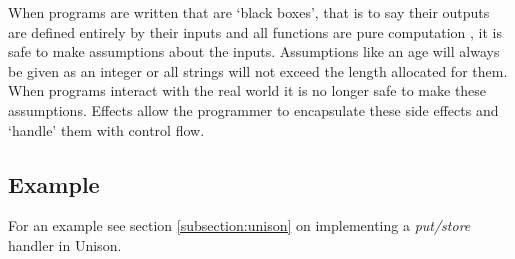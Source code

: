 \documentclass[logo,bsc,singlespacing,parskip]{infthesis}
\begin{document}
When programs are written that are `black boxes', that is to say their outputs
are defined entirely by their inputs and all functions are pure computation
\cite{hughes1989functional}, it is safe to make assumptions about the inputs.
Assumptions like an age will always be given as an integer or all strings will
not exceed the length allocated for them. When programs interact with the real
world it is no longer safe to make these assumptions. Effects allow the
programmer to encapsulate these side effects and `handle' them with control
flow.

\subsection{Example}

For an example see section \ref{subsection:unison} on implementing a \emph{put/store} handler in Unison.








\end{document}
